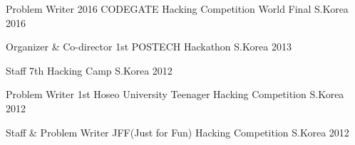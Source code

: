 
\begin{cvhonors}

  \cvhonor
  {Problem Writer} %
  {2016 CODEGATE Hacking Competition World Final} %
  {S.Korea} %
  {2016} %

  \cvhonor
  {Organizer \& Co-director} %
  {1st POSTECH Hackathon} %
  {S.Korea} %
  {2013} %

  \cvhonor
  {Staff} %
  {7th Hacking Camp} %
  {S.Korea} %
  {2012} %

  \cvhonor
  {Problem Writer} %
  {1st Hoseo University Teenager Hacking Competition} %
  {S.Korea} %
  {2012} %

  \cvhonor
  {Staff \& Problem Writer} %
  {JFF(Just for Fun) Hacking Competition} %
  {S.Korea} %
  {2012} %

\end{cvhonors}
